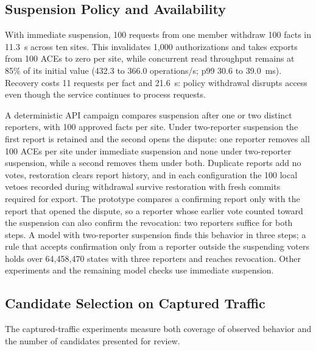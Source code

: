 \documentclass[journal]{IEEEtran}
\theoremstyle{definition}
\begin{document}
\subsection{Suspension Policy and Availability}
\label{sec:suspension-policy}
With immediate suspension, 100 requests from one member withdraw 100 facts in 11.3~s across ten sites. This invalidates 1,000 authorizations and takes exports from 100 ACEs to zero per site, while concurrent read throughput remains at 85\% of its initial value (432.3 to 366.0 operations/s; p99 30.6 to 39.0~ms). Recovery costs 11 requests per fact and 21.6~s: policy withdrawal disrupts access even though the service continues to process requests.

A deterministic API campaign compares suspension after one or two distinct reporters, with 100 approved facts per site. Under two-reporter suspension the first report is retained and the second opens the dispute: one reporter removes all 100 ACEs per site under immediate suspension and none under two-reporter suspension, while a second removes them under both. Duplicate reports add no votes, restoration clears report history, and in each configuration the 100 local vetoes recorded during withdrawal survive restoration with fresh commits required for export. The prototype compares a confirming report only with the report that opened the dispute, so a reporter whose earlier vote counted toward the suspension can also confirm the revocation: two reporters suffice for both steps. A model with two-reporter suspension finds this behavior in three steps; a rule that accepts confirmation only from a reporter outside the suspending voters holds over 64,458,470 states with three reporters and reaches revocation. Other experiments and the remaining model checks use immediate suspension.

\subsection{Candidate Selection on Captured Traffic}
\label{sec:utility-results}
The captured-traffic experiments measure both coverage of observed behavior and the number of candidates presented for review.


\end{document}
